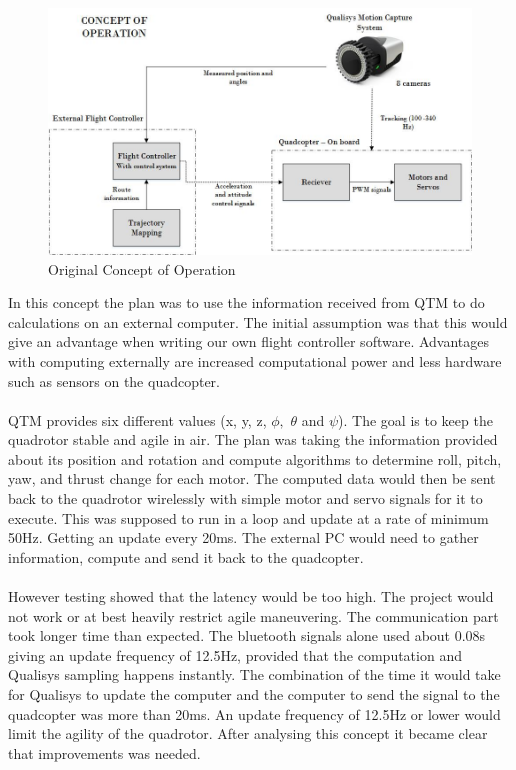 \begin{figure}[H]
          \centering
            \includegraphics[scale = 0.6]{VAPIQ-PICTURES/ConceptOfOperation.jpg}
                \caption{Original Concept of Operation}
                \label{OCO}
            \label{dir}
\end{figure} 
\newpage
\noindent 
In this concept the plan was to use the information received from QTM to do calculations on an external computer. The initial assumption was that this would give an advantage when writing our own flight controller software. Advantages with computing externally are increased computational power and less hardware such as sensors on the quadcopter. 
\\\\
QTM provides six different values (x, y, z, $ \phi, $ $ \theta $ and $ \psi $). The goal is to keep the quadrotor stable and agile in air. The plan was taking the information provided about its position and rotation and compute algorithms to determine roll, pitch, yaw, and thrust change for each motor. The computed data would then be sent back to the quadrotor wirelessly with simple motor and servo signals for it to execute. This was supposed to run in a loop and update at a rate of minimum 50Hz. Getting an update every 20ms. The external PC would need to gather information, compute and send it back to the quadcopter. \\
\\
However testing showed that the latency would be too high. The project would not work or at best heavily restrict agile maneuvering. The communication part took longer time than expected. The bluetooth signals alone used about 0.08s giving an update frequency of 12.5Hz, provided that the computation and Qualisys sampling happens instantly. The combination of the time it would take for Qualisys to update the computer and the computer to send the signal to the quadcopter was more than 20ms. An update frequency of 12.5Hz or lower would limit the agility of the quadrotor. After analysing this concept it became clear that improvements was needed.

